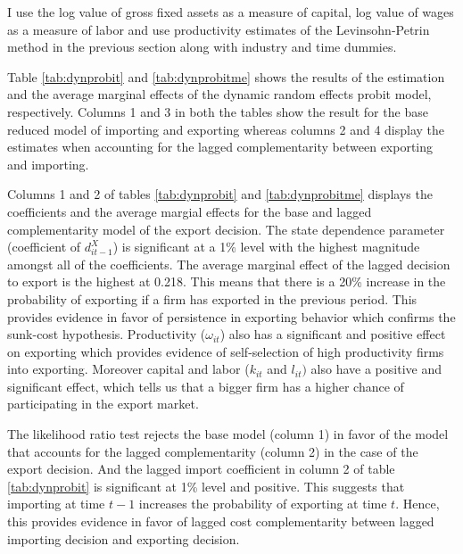 \documentclass[12pt]{article}
\begin{document}
I use the log value of gross fixed assets as a measure of capital, log
value of wages as a measure of labor and use productivity estimates  of
the Levinsohn-Petrin method in the previous section along with
industry and time dummies.  

Table \ref{tab:dynprobit} and \ref{tab:dynprobitme} shows the results of the 
estimation and the average marginal effects of the dynamic random
effects probit model, respectively. Columns 1 and 3 in both the tables show the result for the base
reduced model of importing and exporting  whereas columns 2 and 4
display the estimates when accounting for the lagged complementarity
between exporting and importing. 

  Columns 1 and 2 of tables \ref{tab:dynprobit} and
  \ref{tab:dynprobitme} displays the coefficients and the average margial effects for the base and lagged complementarity model of the export decision. The state dependence parameter (coefficient of $d_{it-1}^{X}$) is significant at a 1\% level with the highest magnitude amongst all of
  the coefficients. The average marginal effect of the lagged decision to export is the highest at 0.218. This  means that there is a 20\% increase
  in the probability of exporting if a firm has exported in the previous
  period. This provides evidence in favor of  persistence in
  exporting behavior which confirms the sunk-cost hypothesis.   Productivity ($\omega_{it}$) also has a significant and
  positive effect on exporting which provides evidence of self-selection of high productivity firms into exporting. Moreover
  capital and labor ($k_{it}$ and $l_{it})$
  also have a positive and significant effect, which tells us that a
  bigger firm has a higher chance of participating in the export
  market. 


The likelihood ratio test rejects the base model (column 1) in favor of the
model that accounts for the lagged complementarity (column 2) in the case of 
the export decision. And the lagged import coefficient in column 2 of table \ref{tab:dynprobit} is
  significant  at 1\% level and positive. This suggests that importing
  at time $t-1$ increases the probability of exporting at time $t$.
  Hence, this provides evidence  in favor of  lagged cost complementarity
  between lagged importing decision  and exporting decision. 
\end{document}
